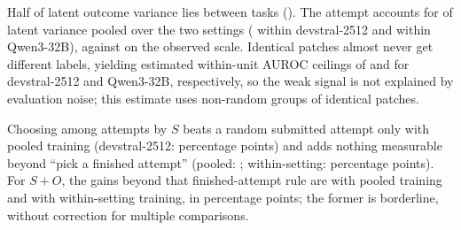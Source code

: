 Half of latent outcome variance lies between tasks (). The attempt accounts for  of latent variance pooled over the two settings ( within devstral-2512 and  within Qwen3-32B), against  on the observed scale. Identical patches almost never get different labels, yielding estimated within-unit AUROC ceilings of  and  for devstral-2512 and Qwen3-32B, respectively, so the weak signal is not explained by evaluation noise; this estimate uses non-random groups of identical patches.

Choosing among  attempts by $S$ beats a random submitted attempt only with pooled training (devstral-2512:  percentage points) and adds nothing measurable beyond ``pick a finished attempt'' (pooled: ; within-setting:  percentage points). For $S+O$, the gains beyond that finished-attempt rule are  with pooled training and  with within-setting training, in percentage points; the former is borderline, without correction for multiple comparisons.
